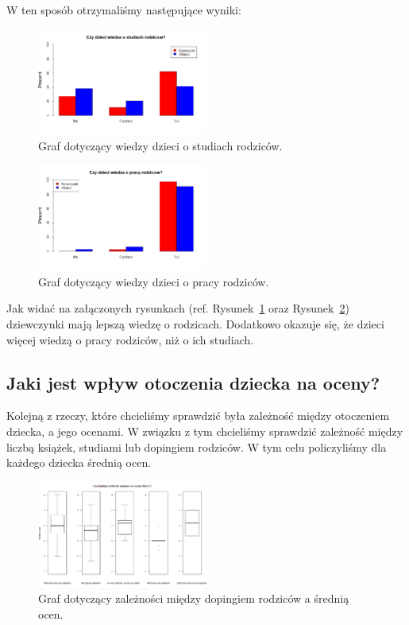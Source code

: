 \documentclass[conference]{IEEEtran}
\begin{document}
W ten sposób otrzymaliśmy następujące wyniki:

\begin{figure}
	\centering
	\includegraphics[width=0.5\textwidth]{1.png}
	\caption{Graf dotyczący wiedzy dzieci o studiach rodziców.}
	\label{fig:studies_knowledge}
\end{figure}
\begin{figure}
	\centering
	\includegraphics[width=0.5\textwidth]{2.png}
	\caption{Graf dotyczący wiedzy dzieci o pracy rodziców.}
	\label{fig:work_knowledge}
\end{figure}

Jak widać na załączonych rysunkach (ref. Rysunek~\ref{fig:studies_knowledge} oraz Rysunek~\ref{fig:work_knowledge}) dziewczynki mają lepszą wiedzę o rodzicach. Dodatkowo okazuje się, że dzieci więcej wiedzą o pracy rodziców, niż o ich studiach.

\subsection{Jaki jest wpływ otoczenia dziecka na oceny?}
Kolejną z rzeczy, które chcieliśmy sprawdzić była zależność między otoczeniem dziecka, a jego ocenami. W związku z tym chcieliśmy sprawdzić zależność między liczbą książek, studiami lub dopingiem rodziców. W tym celu policzyliśmy dla każdego dziecka średnią ocen.

\begin{figure}
	\centering
	\includegraphics[width=0.5\textwidth]{3.png}
	\caption{Graf dotyczący zależności między dopingiem rodziców a  średnią ocen.}
	\label{fig:doping_oceny}
\end{figure}
\end{document}
